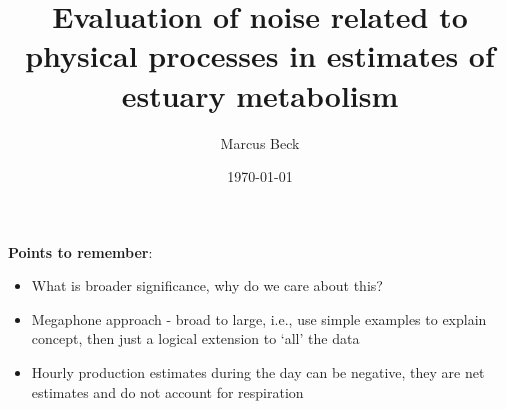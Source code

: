 \documentclass[letterpaper,12pt,oneside]{article}
\begin{document}
\title{Evaluation of noise related to physical processes in estimates of estuary metabolism}
\author{Marcus Beck}
\date{\today}

\maketitle

\textbf{Points to remember}:
\begin{itemize}
\item What is broader significance, why do we care about this?
\item Megaphone approach - broad to large, i.e., use simple examples to explain concept, then just a logical extension to `all' the data
\item Hourly production estimates during the day can be negative, they are net estimates and do not account for respiration
\end{itemize}
\end{document}
